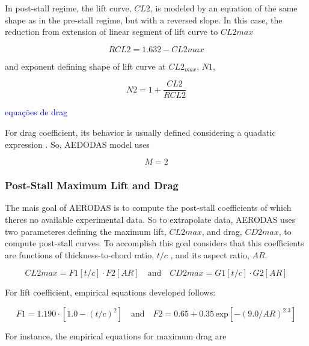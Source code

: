 In post-stall regime, the lift curve, $CL2$, is modeled by an equation of the same shape as in the pre-stall regime, but with a reversed slope. In this case, the reduction from extension of linear segment of lift curve to $CL2max$

\begin{equation}
    RCL2 = 1.632- CL2max
\end{equation}

and exponent defining shape of lift curve at $CL2_{max}$, $N1$,

\begin{equation}
    N2 = 1 + \frac{CL2}{RCL2}
\end{equation}


\textcolor{blue}{equações de drag}

For drag coefficient, its behavior is usually defined considering a quadatic expression \cite{spera_models_2008}. So, AEDODAS model uses 

\begin{equation}
    M = 2
\end{equation}

\subsubsection{Post-Stall Maximum Lift and Drag}

The mais goal of AERODAS is to compute the post-stall coefficients of which theres no available experimental data. So to extrapolate data, AERODAS uses two parameteres defining the maximum lift, $CL2max$, and drag, $CD2max$, to compute post-stall curves. To accomplish this goal \cite{spera_models_2008} considers  that this coefficients are functions of thickness-to-chord ratio, $t/c$ , and its aspect ratio, $AR$.

\begin{equation}
    CL2max = F1  \left[ t/c \right] \cdot F2 \left[ AR \right] \quad \text{and} \quad CD2max= G1 \left[ t/c \right] \cdot G2 \left[ AR \right]
\end{equation}

For lift coefficient, empirical equations developed follows:

\begin{equation}
    F1=1.190\cdot\left[1.0-\left(t/c\right)^{2}\right] \quad \text{and} \quad F2= 0.65 + 0.35\,\mathrm{exp}\left[-\left(9.0\slash{A}R\right)^{2.3}\right]
\end{equation}

For instance, the empirical equations for maximum drag are


